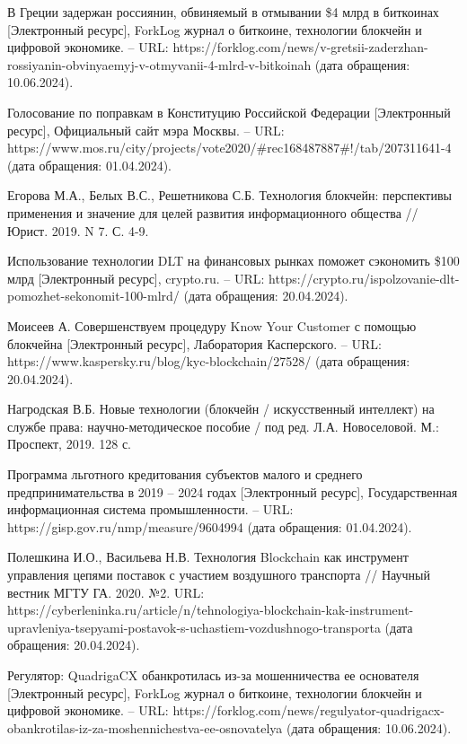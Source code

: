 \begin{thebibliography}{00}
 В Греции задержан россиянин, обвиняемый в отмывании \$4 млрд в биткоинах [Электронный ресурс], ForkLog журнал о биткоине, технологии блокчейн и цифровой экономике. -- URL: https://forklog.com/news/v-gretsii-zaderzhan-rossiyanin-obvinyaemyj-v-otmyvanii-4-mlrd-v-bitkoinah (дата обращения: 10.06.2024).

 Голосование по поправкам в Конституцию Российской Федерации [Электронный ресурс], Официальный сайт мэра Москвы. -- URL: https://www.mos.ru/city/projects/vote2020/\#rec168487887\#!/tab/207311641-4 (дата обращения: 01.04.2024).

 Егорова М.А., Белых В.С., Решетникова С.Б. Технология блокчейн: перспективы применения и значение для целей развития информационного общества // Юрист. 2019. N 7. С. 4-9.

 Использование технологии DLT на финансовых рынках поможет сэкономить \$100 млрд [Электронный ресурс], crypto.ru. -- URL: https://crypto.ru/ispolzovanie-dlt-pomozhet-sekonomit-100-mlrd/ (дата обращения: 20.04.2024).

 Моисеев А. Совершенствуем процедуру Know Your Customer с помощью блокчейна [Электронный ресурс], Лаборатория Касперского. -- URL: https://www.kaspersky.ru/blog/kyc-blockchain/27528/ (дата обращения: 20.04.2024).

 Нагродская В.Б. Новые технологии (блокчейн / искусственный интеллект) на службе права: научно-методическое пособие / под ред. Л.А. Новоселовой. М.: Проспект, 2019. 128 с.

 Программа льготного кредитования субъектов малого и среднего предпринимательства в 2019 – 2024 годах [Электронный ресурс], Государственная информационная система промышленности. -- URL: https://gisp.gov.ru/nmp/measure/9604994 (дата обращения: 01.04.2024).

 Полешкина И.О., Васильева Н.В. Технология Blockchain как инструмент управления цепями поставок с участием воздушного транспорта // Научный вестник МГТУ ГА. 2020. №2. URL: https://cyberleninka.ru/article/n/tehnologiya-blockchain-kak-instrument-upravleniya-tsepyami-postavok-s-uchastiem-vozdushnogo-transporta (дата обращения: 20.04.2024).

 Регулятор: QuadrigaCX обанкротилась из-за мошенничества ее основателя [Электронный ресурс], ForkLog журнал о биткоине, технологии блокчейн и цифровой экономике. -- URL: https://forklog.com/news/regulyator-quadrigacx-obankrotilas-iz-za-moshennichestva-ee-osnovatelya (дата обращения: 10.06.2024).


\end{thebibliography}
